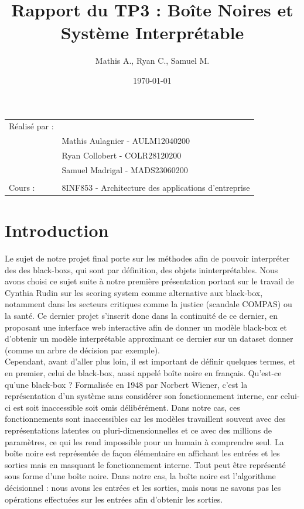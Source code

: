 \documentclass{article}
\title{Rapport du TP3 : Boîte Noires et Système Interprétable}
\author{Mathis A., Ryan C., Samuel M.}
\date{\today}
\begin{document}
\maketitle
\noindent\begin{tabular}{@{}ll}
    Réalisé par :\\
        & Mathis Aulagnier - AULM12040200 \\
        & Ryan Collobert - COLR28120200 \\
        & Samuel Madrigal - MADS23060200 \\
        \\
    Cours :  &  8INF853 - Architecture des applications d'entreprise \\
\end{tabular}

\tableofcontents

\clearpage

\section{Introduction}

\quad Le sujet de notre projet final porte sur les méthodes afin de pouvoir interpréter des des black-boxs, qui sont par définition, des objets ininterprétables. Nous avons choisi ce sujet suite à notre première présentation portant sur le travail de Cynthia Rudin sur les scoring system comme alternative aux black-box, notamment dans les secteurs critiques comme la justice (scandale COMPAS) ou la santé. Ce dernier projet s’inscrit donc dans la continuité de ce dernier, en proposant une interface web interactive afin de donner un modèle black-box et d’obtenir un modèle interprétable approximant ce dernier sur un dataset donner (comme un arbre de décision par exemple).\\

Cependant, avant d’aller plus loin, il est important de définir quelques termes, et en premier, celui de black-box, aussi appelé boîte noire en français. Qu’est-ce qu’une black-box ? Formalisée en 1948 par Norbert Wiener, c’est la représentation d'un système sans considérer son fonctionnement interne, car celui-ci est soit inaccessible soit omis délibérément. Dans notre cas, ces fonctionnements sont inaccessibles car les modèles travaillent souvent avec des représentations latentes ou pluri-dimensionnelles et ce avec des millions de paramètres, ce qui les rend impossible pour un humain à comprendre seul. La boîte noire est représentée de façon élémentaire en affichant les entrées et les sorties mais en masquant le fonctionnement interne. Tout peut être représenté sous forme d'une boîte noire. Dans notre cas, la boîte noire est l’algorithme décisionnel : nous avons les entrées et les sorties, mais nous ne savons pas les opérations effectuées sur les entrées afin d’obtenir les sorties.\\
\end{document}
